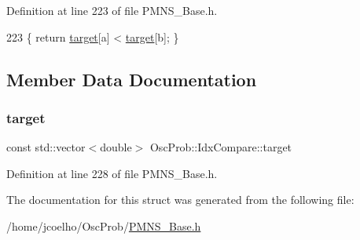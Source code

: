 Definition at line 223 of file P\+M\+N\+S\+\_\+\+Base.\+h.


\begin{DoxyCode}
223 \{ \textcolor{keywordflow}{return} \hyperlink{structOscProb_1_1IdxCompare_ab3258085f0afeb64bf472413bfed43ac}{target}[a] < \hyperlink{structOscProb_1_1IdxCompare_ab3258085f0afeb64bf472413bfed43ac}{target}[b]; \}
\end{DoxyCode}


\subsection{Member Data Documentation}
\mbox{\label{structOscProb_1_1IdxCompare_ab3258085f0afeb64bf472413bfed43ac}} 
\subsubsection{\texorpdfstring{target}{target}}
{\footnotesize\ttfamily const std\+::vector$<$double$>$ Osc\+Prob\+::\+Idx\+Compare\+::target\hspace{0.3cm}{\ttfamily [private]}}



Definition at line 228 of file P\+M\+N\+S\+\_\+\+Base.\+h.



The documentation for this struct was generated from the following file\+:\begin{DoxyCompactItemize}
\item 
/home/jcoelho/\+Osc\+Prob/\hyperlink{PMNS__Base_8h}{P\+M\+N\+S\+\_\+\+Base.\+h}\end{DoxyCompactItemize}
